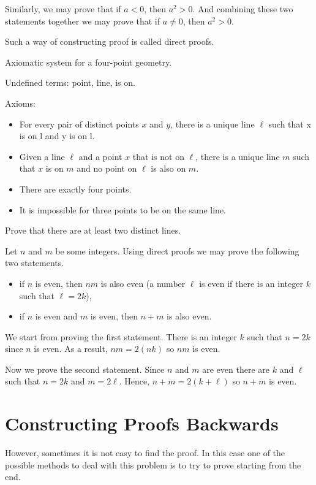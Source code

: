Similarly, we may prove that if $a < 0$, then $a^2 > 0$. And combining these
two statements together we may prove that if $a \neq 0$, then $a^2 > 0$.

Such a way of constructing proof is called direct proofs.

\begin{exercise}
  Axiomatic system for a four-point geometry.

  Undefined terms: point, line, is on.

  Axioms:
  \begin{itemize}
    \item For every pair of distinct points $x$ and $y$, there is a unique line
      $\ell$ such that x is on l and y is on l.
    \item Given a line $\ell$ and a point $x$ that is not on $\ell$, there is a
      unique line $m$ such that $x$ is on $m$ and no point on $\ell$ is also on
      $m$.
    \item There are exactly four points.
    \item It is impossible for three points to be on the same line.
  \end{itemize}
  Prove that there are at least two distinct lines.
\end{exercise}

Let $n$ and $m$ be some integers. Using direct proofs we may prove the
following two statements.
\begin{itemize}
  \item if $n$ is even, then $nm$ is also even (a number $\ell$ is even
    if there is an integer $k$ such that $\ell = 2k$),
  \item if $n$ is even and $m$ is even, then $n + m$ is also even.
\end{itemize}

We start from proving the first statement. There is an integer $k$ such that
$n = 2k$ since $n$ is even. As a result, $nm = 2 (nk)$ so $nm$ is even.

Now we prove the second statement. Since $n$ and $m$ are even there are $k$ and
$\ell$ such that $n = 2k$ and $m = 2\ell$. Hence, $n + m = 2 (k + \ell)$ so
$n + m$ is even.

\section{Constructing Proofs Backwards}
However, sometimes it is not easy to find the proof. In this case one of the
possible methods to deal with this problem is to try to prove starting from
the end.

